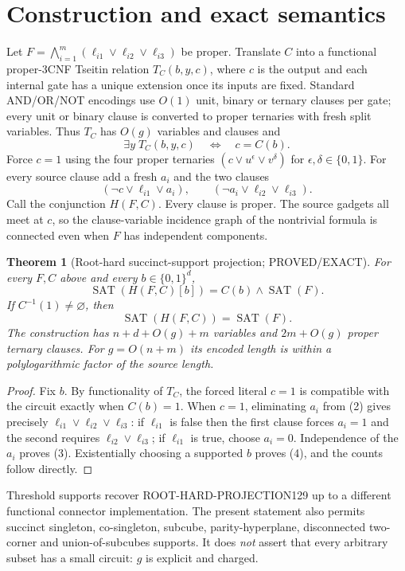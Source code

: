 \documentclass[11pt]{article}
\newtheorem{theorem}{Theorem}
\newcommand{\SAT}{\operatorname{SAT}}
\begin{document}
\section{Construction and exact semantics}
Let $F=\bigwedge_{i=1}^m(\ell_{i1}\vee\ell_{i2}\vee\ell_{i3})$
be proper.  Translate $C$ into a functional proper-3CNF Tseitin relation
$T_C(b,y,c)$, where $c$ is the output and each internal gate has a unique
extension once its inputs are fixed.  Standard AND/OR/NOT encodings use
$O(1)$ unit, binary or ternary clauses per gate; every unit or binary clause
is converted to proper ternaries with fresh split variables.  Thus
$T_C$ has $O(g)$ variables and clauses and
\[
 \exists y\;T_C(b,y,c)\quad\Longleftrightarrow\quad c=C(b).
 \tag{1}
\]
Force $c=1$ using the four proper ternaries
$(c\vee u^{\epsilon}\vee v^{\delta})$ for
$\epsilon,\delta\in\{0,1\}$.  For every source clause add a fresh $a_i$ and
the two clauses
\[
 (\neg c\vee\ell_{i1}\vee a_i),\qquad
 (\neg a_i\vee\ell_{i2}\vee\ell_{i3}).
 \tag{2}
\]
Call the conjunction $H(F,C)$.  Every clause is proper.  The source gadgets
all meet at $c$, so the clause-variable incidence graph of the nontrivial
formula is connected even when $F$ has independent components.

\begin{theorem}[Root-hard succinct-support projection; PROVED/EXACT]
For every $F,C$ above and every $b\in\{0,1\}^d$,
\[
 \boxed{\SAT(H(F,C)[b])=C(b)\wedge\SAT(F).}
 \tag{3}
\]
If $C^{-1}(1)\ne\varnothing$, then
\[
 \boxed{\SAT(H(F,C))=\SAT(F).}
 \tag{4}
\]
The construction has $n+d+O(g)+m$ variables and $2m+O(g)$ proper ternary
clauses.  For $g=O(n+m)$ its encoded length is within a polylogarithmic
factor of the source length.
\end{theorem}
\begin{proof}
Fix $b$.  By functionality of $T_C$, the forced literal $c=1$ is compatible
with the circuit exactly when $C(b)=1$.  When $c=1$, eliminating $a_i$ from
(2) gives precisely
$\ell_{i1}\vee\ell_{i2}\vee\ell_{i3}$: if $\ell_{i1}$ is false then the
first clause forces $a_i=1$ and the second requires
$\ell_{i2}\vee\ell_{i3}$; if $\ell_{i1}$ is true, choose $a_i=0$.
Independence of the $a_i$ proves (3).  Existentially choosing a supported
$b$ proves (4), and the counts follow directly.
\end{proof}

Threshold supports recover ROOT-HARD-PROJECTION129 up to a different
functional connector implementation.  The present statement also permits
succinct singleton, co-singleton, subcube, parity-hyperplane, disconnected
two-corner and union-of-subcubes supports.  It does \emph{not} assert that
every arbitrary subset has a small circuit: $g$ is explicit and charged.
\end{document}
